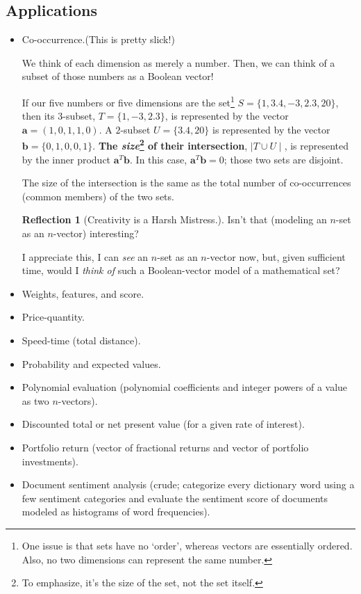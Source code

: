 \documentclass[11pt]{book}
\theoremstyle{definition}
\theoremstyle{plain}
\theoremstyle{problemstyle}
\theoremstyle{remark}
\theoremstyle{definition}
\newtheorem{reflection}{Reflection}
\begin{document}
\subsection*{Applications}
\begin{itemize}
    \item Co-occurrence.(This is pretty slick!) 

        We think of each dimension as merely a number. Then, we can think of a subset of those numbers as a Boolean vector!

        If our five numbers or five dimensions are the set\footnote{One issue is that sets have no `order', whereas vectors are essentially ordered. Also, no two dimensions can represent the same number.} $S=\{1,3.4,-3,2.3,20\}$, then its $3$-subset, $T=\{1,-3,2.3\}$, is represented by the vector $\boldsymbol{a}=(1,0,1,1,0)$. A $2$-subset $U=\{3.4,20\}$ is represented by the vector $\boldsymbol{b}=\{0,1,0,0,1\}$. \textbf{The \emph{size}\footnote{To emphasize, it's the size of the set, not the set itself.} of their intersection}, $\mid T\cup U\mid$, is represented by the inner product $\boldsymbol{a}^T\boldsymbol{b}$. In this case, $\boldsymbol{a}^T\boldsymbol{b}=0$; those two sets are disjoint. 

        The size of the intersection is the same as the total number of co-occurrences (common members) of the two sets.

        \begin{reflection}[Creativity is a Harsh Mistress.]
            Isn't that (modeling an $n$-set as an $n$-vector) interesting?

            I appreciate this, I can \emph{see} an $n$-set as an $n$-vector now, but, given sufficient time, would I \emph{think of} such a Boolean-vector model of a mathematical set?
        \end{reflection}
        
    \item Weights, features, and score.
    \item Price-quantity.
    \item Speed-time (total distance).
    \item Probability and expected values.
    \item Polynomial evaluation (polynomial coefficients and integer powers of a value as two $n$-vectors).
    \item Discounted total or net present value (for a given rate of interest).
    \item Portfolio return (vector of fractional returns and vector of portfolio investments).
    \item Document sentiment analysis (crude; categorize every dictionary word using a few sentiment categories and evaluate the sentiment score of documents modeled as histograms of word frequencies).
\end{itemize}
\end{document}
